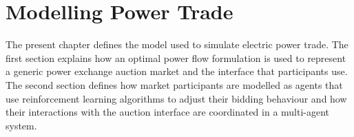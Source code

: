 \chapter{Modelling Power Trade}
\label{ch:method}
The present chapter defines the model used to simulate electric power trade.
The first section explains how an optimal power flow formulation is used to
represent a generic power exchange auction market and the interface that
participants use.  The second section defines how market
participants are modelled as agents that use reinforcement learning algorithms
to adjust their bidding behaviour and how their interactions with the auction
interface are coordinated in a multi-agent system.

%
%
%
